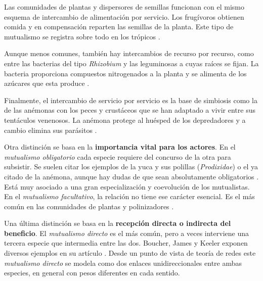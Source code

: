 Las comunidades de plantas y dispersores de semillas funcionan con el mismo esquema de intercambio de alimentación por servicio. Los frugívoros obtienen comida y en compensación reparten las semillas de la planta. Este tipo de mutualismo se registra sobre todo en los trópicos \cite{bascompte2007plant, estrada2012frugivores}.
	
Aunque menos comunes, también hay intercambios de recurso por recurso, como entre las bacterias del tipo \textit{Rhizobium} y las leguminosas a cuyas raíces se fijan. La bacteria proporciona compuestos nitrogenados a la planta y se alimenta de los azúcares que esta produce \cite{lindstrom2010biodiversity}.
	
Finalmente, el intercambio de servicio por servicio es la base de simbiosis como la de las anémonas con los peces y crustáceos que se han adaptado a vivir entre sus tentáculos venenosos. La anémona protege al huésped de los depredadores y a cambio elimina sus parásitos \cite{mebs2009chemical}.

Otra distinción se basa en la \textbf{importancia vital para los actores}. En el \textit{mutualismo obligatorio} cada especie requiere del concurso de la otra para subsistir. Se suelen citar los ejemplos de la yuca y sus polillas (\textit{Prodixidae}) o el ya citado de la anémona, aunque hay dudas de que sean absolutamente obligatorios \cite{briand1982phylogenetic, addicott1995cheating}. Está muy asociado a una gran especialización y coevolución de los mutualistas. En el \textit{mutualismo facultativo}, la relación no tiene ese carácter esencial. Es el más común en las comunidades de plantas y polinizadores \cite{geib2012tracing}.

Una última distinción se basa en la \textbf{recepción directa o indirecta del beneficio}. El \textit{mutualismo directo} es el más común, pero a veces interviene una tercera especie que
intermedia entre las dos. Boucher, James y Keeler exponen diversos ejemplos en su artículo \cite{boucher1982ecology}. Desde un punto de vista de teoría de redes este \textit{mutualismo directo} se modela como dos enlaces unidireccionales entre ambas especies, en general con pesos diferentes en cada sentido.



